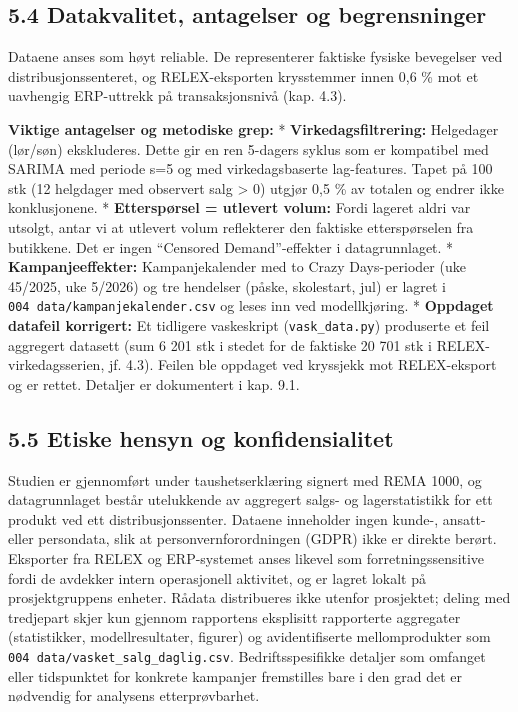 \documentclass[
  norsk,
  11pt,
  a4paper,
]{article}
\begin{document}
\subsection{5.4 Datakvalitet, antagelser og
begrensninger}\label{datakvalitet-antagelser-og-begrensninger}

Dataene anses som høyt reliable. De representerer faktiske fysiske
bevegelser ved distribusjonssenteret, og RELEX-eksporten krysstemmer
innen 0,6 \% mot et uavhengig ERP-uttrekk på transaksjonsnivå (kap.
4.3).

\textbf{Viktige antagelser og metodiske grep:} *
\textbf{Virkedagsfiltrering:} Helgedager (lør/søn) ekskluderes. Dette
gir en ren 5-dagers syklus som er kompatibel med SARIMA med periode s=5
og med virkedagsbaserte lag-features. Tapet på 100 stk (12 helgdager med
observert salg \textgreater{} 0) utgjør 0,5 \% av totalen og endrer ikke
konklusjonene. * \textbf{Etterspørsel = utlevert volum:} Fordi lageret
aldri var utsolgt, antar vi at utlevert volum reflekterer den faktiske
etterspørselen fra butikkene. Det er ingen ``Censored Demand''-effekter
i datagrunnlaget. * \textbf{Kampanjeeffekter:} Kampanjekalender med to
Crazy Days-perioder (uke 45/2025, uke 5/2026) og tre hendelser (påske,
skolestart, jul) er lagret i \texttt{004\ data/kampanjekalender.csv} og
leses inn ved modellkjøring. * \textbf{Oppdaget datafeil korrigert:} Et
tidligere vaskeskript (\texttt{vask\_data.py}) produserte et feil
aggregert datasett (sum 6 201 stk i stedet for de faktiske 20 701 stk i
RELEX-virkedagsserien, jf. 4.3). Feilen ble oppdaget ved kryssjekk mot
RELEX-eksport og er rettet. Detaljer er dokumentert i kap. 9.1.

\subsection{5.5 Etiske hensyn og
konfidensialitet}\label{etiske-hensyn-og-konfidensialitet}

Studien er gjennomført under taushetserklæring signert med REMA 1000, og
datagrunnlaget består utelukkende av aggregert salgs- og lagerstatistikk
for ett produkt ved ett distribusjonssenter. Dataene inneholder ingen
kunde-, ansatt- eller persondata, slik at personvernforordningen (GDPR)
ikke er direkte berørt. Eksporter fra RELEX og ERP-systemet anses
likevel som forretningssensitive fordi de avdekker intern operasjonell
aktivitet, og er lagret lokalt på prosjektgruppens enheter. Rådata
distribueres ikke utenfor prosjektet; deling med tredjepart skjer kun
gjennom rapportens eksplisitt rapporterte aggregater (statistikker,
modellresultater, figurer) og avidentifiserte mellomprodukter som
\texttt{004\ data/vasket\_salg\_daglig.csv}. Bedriftsspesifikke detaljer
som omfanget eller tidspunktet for konkrete kampanjer fremstilles bare i
den grad det er nødvendig for analysens etterprøvbarhet.
\end{document}

